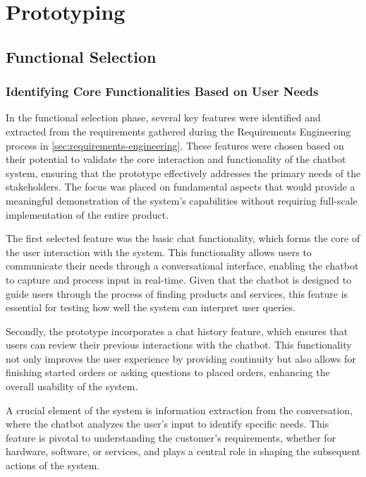 \newpage


\section{Prototyping}\label{sec:prototyping}

\subsection{Functional Selection}\label{subsec:functional-selection}

\subsubsection{Identifying Core Functionalities Based on User Needs}

In the functional selection phase, several key features were identified and extracted from the requirements gathered
during the Requirements Engineering process in \ref{sec:requirements-engineering}. These features were chosen based on
their potential to validate the core interaction and functionality of the chatbot system, ensuring that the prototype
effectively addresses the primary needs of the stakeholders. The focus was placed on fundamental aspects that would
provide a meaningful demonstration of the system’s capabilities without requiring full-scale implementation of the
entire product.

The first selected feature was the basic chat functionality, which forms the core of the user interaction with the
system. This functionality allows users to communicate their needs through a conversational interface, enabling the
chatbot to capture and process input in real-time. Given that the chatbot is designed to guide users through the process
of finding products and services, this feature is essential for testing how well the system can interpret user queries.

Secondly, the prototype incorporates a chat history feature, which ensures that users can review their previous
interactions with the chatbot. This functionality not only improves the user experience by providing continuity but also
allows for finishing started orders or asking questions to placed orders, enhancing the overall usability of the system.

A crucial element of the system is information extraction from the conversation, where the chatbot analyzes the user’s
input to identify specific needs. This feature is pivotal to understanding the customer's requirements, whether for
hardware, software, or services, and plays a central role in shaping the subsequent actions of the system.

